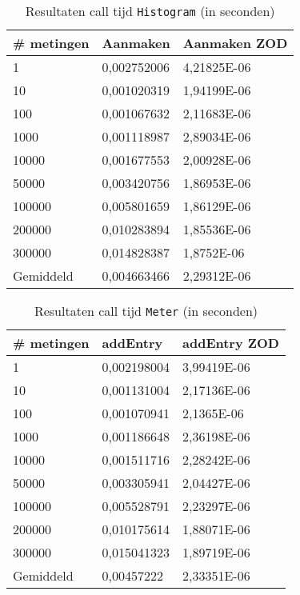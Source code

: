 \begin{table}[]
\centering
\begin{tabular}{|l|l|l|}
\hline
\# metingen & Aanmaken    & Aanmaken ZOD \\ \hline
1           & 0,002752006 & 4,21825E-06  \\ \hline
10          & 0,001020319 & 1,94199E-06  \\ \hline
100         & 0,001067632 & 2,11683E-06  \\ \hline
1000        & 0,001118987 & 2,89034E-06  \\ \hline
10000       & 0,001677553 & 2,00928E-06  \\ \hline
50000       & 0,003420756 & 1,86953E-06  \\ \hline
100000      & 0,005801659 & 1,86129E-06  \\ \hline
200000      & 0,010283894 & 1,85536E-06  \\ \hline
300000      & 0,014828387 & 1,8752E-06   \\ \hline
Gemiddeld   & 0,004663466 & 2,29312E-06  \\ \hline
\end{tabular}
\caption{Resultaten call tijd \texttt{Histogram} (in seconden)}
\label{Table:Histogram}
\end{table}

\begin{table}[]
\centering
\begin{tabular}{|l|l|l|}
\hline
\# metingen & addEntry    & addEntry ZOD \\ \hline
1           & 0,002198004 & 3,99419E-06  \\ \hline
10          & 0,001131004 & 2,17136E-06  \\ \hline
100         & 0,001070941 & 2,1365E-06   \\ \hline
1000        & 0,001186648 & 2,36198E-06  \\ \hline
10000       & 0,001511716 & 2,28242E-06  \\ \hline
50000       & 0,003305941 & 2,04427E-06  \\ \hline
100000      & 0,005528791 & 2,23297E-06  \\ \hline
200000      & 0,010175614 & 1,88071E-06  \\ \hline
300000      & 0,015041323 & 1,89719E-06  \\ \hline
Gemiddeld   & 0,00457222  & 2,33351E-06  \\ \hline
\end{tabular}
\caption{Resultaten call tijd \texttt{Meter} (in seconden)}
\label{Table:Meter}
\end{table}

